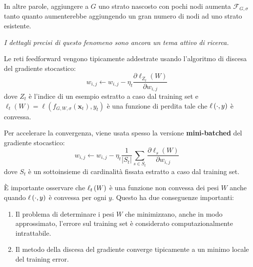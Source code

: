 \documentclass[\main/main.tex]{subfiles}
\begin{document}
\begin{multicols}{2}
\begin{observation}
    In altre parole, aggiungere a \(G\) uno strato nascosto con pochi nodi aumenta \(\mathcal{F}_{G, \sigma}\) tanto quanto aumenterebbe aggiungendo un gran numero di nodi ad uno strato esistente.
    
    \textit{I dettagli precisi di questo fenomeno sono ancora un tema attivo di ricerca.}
\end{observation}
\begin{definition}
    Le reti feedforward vengono tipicamente addestrate usando l'algoritmo di discesa del gradiente stocastico:
    \[w_{i, j} \leftarrow w_{i, j}-\eta_{t} \frac{\partial \ell_{Z_{t}}(W)}{\partial w_{i, j}}\]
    dove \(Z_t\) è l'indice di un esempio estratto a caso dal training set e \(\ell_{t}(W)=\ell\left(f_{G, W, \sigma}\left(\boldsymbol{x}_{t}\right), y_{t}\right)\) è una funzione di perdita tale che \(\ell\left(\cdot,y\right)\) è convessa.
\end{definition}
\begin{definition}
    Per accelerare la convergenza, viene usata spesso la versione \textbf{mini-batched} del gradiente stocastico:
    \[w_{i, j} \leftarrow w_{i, j}-\eta_{t} \frac{1}{\left|S_{t}\right|} \sum_{s \in S_{t}} \frac{\partial \ell_{s}(W)}{\partial w_{i, j}}\]
    dove \(S_t\) è un sottoinsieme di cardinalità fissata estratto a caso dal training set.
\end{definition}
\begin{observation}
    È importante osservare che \(\ell_t\left(W\right)\) è una funzione non convessa dei pesi \(W\) anche quando \(\ell\left(\cdot,y\right)\) è convessa per ogni \(y\). Questo ha due conseguenze importanti:
    \begin{enumerate}
        \item Il problema di determinare i pesi \(W\) che minimizzano, anche in modo approssimato, l'errore sul training set è considerato computazionalmente intrattabile.
        \item Il metodo della discesa del gradiente converge tipicamente a un minimo locale del training error.
    \end{enumerate}
\end{observation}
\end{multicols}
\end{document}

